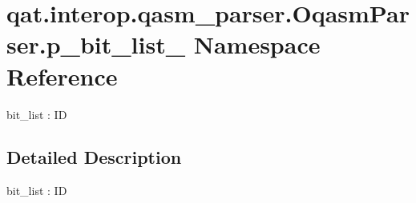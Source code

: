 \hypertarget{namespaceqat_1_1interop_1_1qasm__parser_1_1OqasmParser_1_1p__bit__list__0}{\section{qat.\-interop.\-qasm\-\_\-parser.\-Oqasm\-Parser.\-p\-\_\-bit\-\_\-list\-\_ Namespace Reference}
\label{namespaceqat_1_1interop_1_1qasm__parser_1_1OqasmParser_1_1p__bit__list__0}
}


bit\-\_\-list \-: I\-D  




\subsection{Detailed Description}
bit\-\_\-list \-: I\-D 